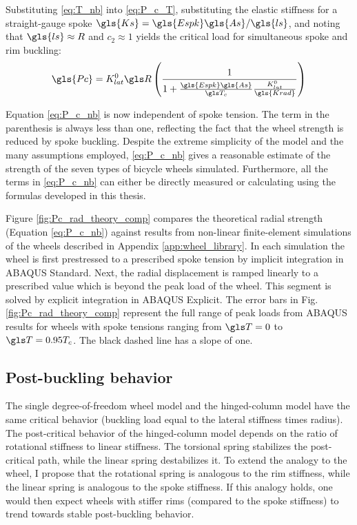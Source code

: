 \documentclass[\rootdir/thesis.tex]{subfiles}
\begin{document}
Substituting \eqref{eq:T_nb} into \eqref{eq:P_c_T}, substituting the elastic stiffness for a straight-gauge spoke $\gls{Ks}=\gls{Espk}\gls{As}/\gls{ls}$, and noting that $\gls{ls} \approx R$ and $c_2\approx 1$ yields the critical load for simultaneous spoke and rim buckling:
\begin{equation}
\label{eq:P_c_nb}
\gls{Pc} = K_{lat}^0 \R \left(\frac{1}{1 + \frac{\gls{Espk}\gls{As}}
						{\T_c}\frac{K_{lat}^0}{\gls{Krad}}}\right)
\end{equation}

Equation \eqref{eq:P_c_nb} is now independent of spoke tension. The term in the parenthesis is always less than one, reflecting the fact that the wheel strength is reduced by spoke buckling. Despite the extreme simplicity of the model and the many assumptions employed, \eqref{eq:P_c_nb} gives a reasonable estimate of the strength of the seven types of bicycle wheels simulated. Furthermore, all the terms in \eqref{eq:P_c_nb} can either be directly measured or calculating using the formulas developed in this thesis.

Figure \ref{fig:Pc_rad_theory_comp} compares the theoretical radial strength (Equation \eqref{eq:P_c_nb}) against results from non-linear finite-element simulations of the wheels described in Appendix \ref{app:wheel_library}. In each simulation the wheel is first prestressed to a prescribed spoke tension by implicit integration in ABAQUS Standard. Next, the radial displacement is ramped linearly to a prescribed value which is beyond the peak load of the wheel. This segment is solved by explicit integration in ABAQUS Explicit. The error bars in Fig. \ref{fig:Pc_rad_theory_comp} represent the full range of peak loads from ABAQUS results for wheels with spoke tensions ranging from $\T=0$ to $\T=0.95T_c$. The black dashed line has a slope of one.

\subsection{Post-buckling behavior}

The single degree-of-freedom wheel model and the hinged-column model have the same critical behavior (buckling load equal to the lateral stiffness times radius). The post-critical behavior of the hinged-column model depends on the ratio of rotational stiffness to linear stiffness. The torsional spring stabilizes the post-critical path, while the linear spring destabilizes it. To extend the analogy to the wheel, I propose that the rotational spring is analogous to the rim stiffness, while the linear spring is analogous to the spoke stiffness. If this analogy holds, one would then expect wheels with stiffer rims (compared to the spoke stiffness) to trend towards stable post-buckling behavior.
\end{document}
